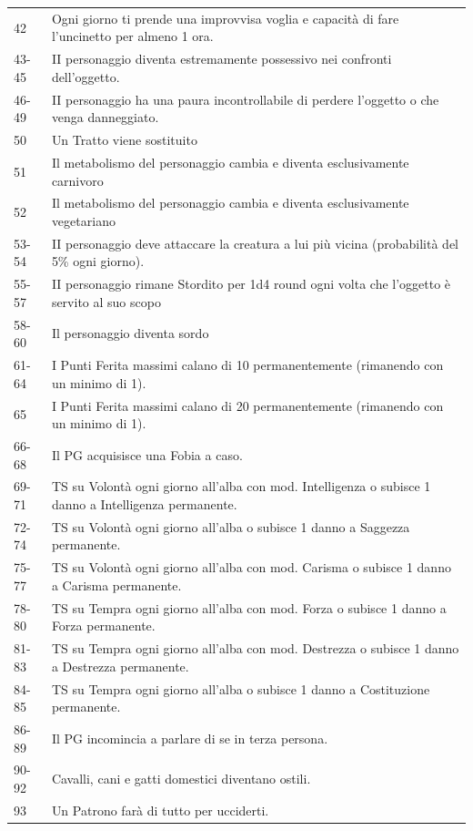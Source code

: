 {\begin{tabularx}{0.95\textwidth}{lX}
		42		& Ogni giorno ti prende una improvvisa voglia e capacità di fare l'uncinetto per almeno 1 ora.\\
		43-45   & II personaggio diventa estremamente possessivo nei confronti dell'oggetto.\\
		46-49   & II personaggio ha una paura incontrollabile di perdere l'oggetto o che venga danneggiato.\\
		50      & Un Tratto viene sostituito\\
		51		& Il metabolismo del personaggio cambia e diventa esclusivamente carnivoro\\
		52		& Il metabolismo del personaggio cambia e diventa esclusivamente vegetariano\\
		53-54   & II personaggio deve attaccare la creatura a lui più vicina (probabilità del 5\% ogni giorno).\\
		55-57   & II personaggio rimane Stordito per 1d4 round ogni volta che l'oggetto è servito al suo scopo\\
		58-60   & Il personaggio diventa sordo\\
		61-64   & I Punti Ferita massimi calano di 10 permanentemente (rimanendo con un minimo di 1).\\
		65      & I Punti Ferita massimi calano di 20 permanentemente (rimanendo con un minimo di 1).\\
		66-68   & Il PG acquisisce una Fobia a caso.\\
		69-71   & TS su Volontà ogni giorno all'alba con mod. Intelligenza o subisce 1 danno a Intelligenza permanente.\\
		72-74   & TS su Volontà ogni giorno all'alba o subisce 1 danno a Saggezza permanente.\\
		75-77   & TS su Volontà ogni giorno all'alba con mod. Carisma o subisce 1 danno a Carisma permanente.\\
		78-80   & TS su Tempra ogni giorno all'alba con mod. Forza o subisce 1 danno a Forza permanente.\\
		81-83   & TS su Tempra ogni giorno all'alba con mod. Destrezza o subisce 1 danno a Destrezza permanente.\\
		84-85   & TS su Tempra ogni giorno all'alba o subisce 1 danno a Costituzione permanente.\\
		86-89	& Il PG incomincia a parlare di se in terza persona.\\
		90-92	& Cavalli, cani e gatti domestici diventano ostili.\\
		93		& Un Patrono farà di tutto per ucciderti.\\

\end{tabularx}}
